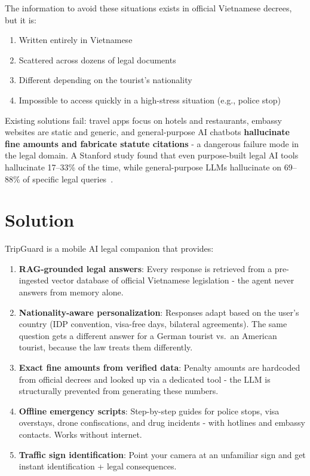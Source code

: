 \documentclass[conference, onecolumn]{IEEEtran}
\begin{document}
The information to avoid these situations exists in official Vietnamese decrees, but it is:
\begin{enumerate}[leftmargin=*]
    \item Written entirely in Vietnamese
    \item Scattered across dozens of legal documents
    \item Different depending on the tourist's nationality
    \item Impossible to access quickly in a high-stress situation (e.g., police stop)
\end{enumerate}

Existing solutions fail: travel apps focus on hotels and restaurants, embassy websites are static and generic, and general-purpose AI chatbots \textbf{hallucinate fine amounts and fabricate statute citations} - a dangerous failure mode in the legal domain. A Stanford study found that even purpose-built legal AI tools hallucinate 17--33\% of the time, while general-purpose LLMs hallucinate on 69--88\% of specific legal queries~\cite{magesh2025, dahl2024}.

\section{Solution}

TripGuard is a mobile AI legal companion that provides:

\begin{enumerate}[leftmargin=*]
    \item \textbf{RAG-grounded legal answers}: Every response is retrieved from a pre-ingested vector database of official Vietnamese legislation - the agent never answers from memory alone.
    \item \textbf{Nationality-aware personalization}: Responses adapt based on the user's country (IDP convention, visa-free days, bilateral agreements). The same question gets a different answer for a German tourist vs.\ an American tourist, because the law treats them differently.
    \item \textbf{Exact fine amounts from verified data}: Penalty amounts are hardcoded from official decrees and looked up via a dedicated tool - the LLM is structurally prevented from generating these numbers.
    \item \textbf{Offline emergency scripts}: Step-by-step guides for police stops, visa overstays, drone confiscations, and drug incidents - with hotlines and embassy contacts. Works without internet.
    \item \textbf{Traffic sign identification}: Point your camera at an unfamiliar sign and get instant identification + legal consequences.
\end{enumerate}
\end{document}
